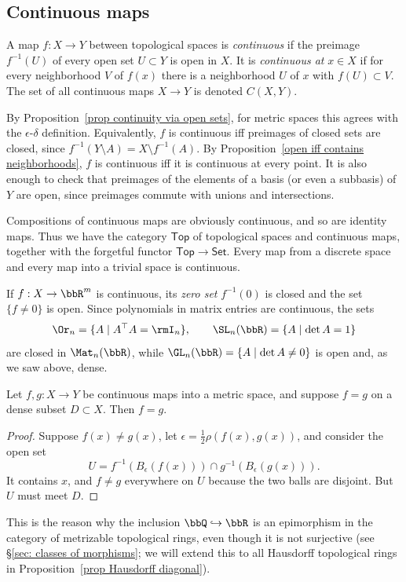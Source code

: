 \subsection{Continuous maps}

\begin{defn}
    A map $f:X\to Y$ between topological spaces is \emph{continuous} if the preimage $f^{-1}(U)$ of every open set $U\subset Y$ is open in $X$. It is \emph{continuous at} $x\in X$ if for every neighborhood $V$ of $f(x)$ there is a neighborhood $U$ of $x$ with $f(U)\subset V$. The set of all continuous maps $X\to Y$ is denoted $C(X,Y)$.
\end{defn}

By Proposition~\ref{prop continuity via open sets}, for metric spaces this agrees with the $\epsilon$-$\delta$ definition. Equivalently, $f$ is continuous iff preimages of closed sets are closed, since $f^{-1}(Y\setminus A)=X\setminus f^{-1}(A)$. By Proposition~\ref{open iff contains neighborhoods}, $f$ is continuous iff it is continuous at every point. It is also enough to check that preimages of the elements of a basis (or even a subbasis) of $Y$ are open, since preimages commute with unions and intersections.

Compositions of continuous maps are obviously continuous, and so are identity maps. Thus we have the category $\mathsf{Top}$ of topological spaces and continuous maps, together with the forgetful functor $\mathsf{Top}\to\mathsf{Set}$. Every map from a discrete space and every map into a trivial space is continuous.

\begin{example}\label{example zero sets}
    If $f:X\to\bbR^m$ is continuous, its \emph{zero set} $f^{-1}(0)$ is closed and the set $\{f\neq 0\}$ is open. Since polynomials in matrix entries are continuous, the sets
    \[\Or_n=\{A\mid A^\top A=\rmI_n\},\qquad \SL_n(\bbR)=\{A\mid\det A=1\}\]
    are closed in $\Mat_n(\bbR)$, while $\GL_n(\bbR)=\{A\mid\det A\neq0\}$ is open and, as we saw above, dense.
\end{example}

\begin{prop}\label{prop dense determines maps}
    Let $f,g:X\to Y$ be continuous maps into a metric space, and suppose $f=g$ on a dense subset $D\subset X$. Then $f=g$.
\end{prop}
\begin{proof}
    Suppose $f(x)\neq g(x)$, let $\epsilon=\frac12\rho(f(x),g(x))$, and consider the open set
    \[U=f^{-1}(B_\epsilon(f(x)))\cap g^{-1}(B_\epsilon(g(x))).\]
    It contains $x$, and $f\neq g$ everywhere on $U$ because the two balls are disjoint. But $U$ must meet $D$.
\end{proof}
This is the reason why the inclusion $\bbQ\hookrightarrow\bbR$ is an epimorphism in the category of metrizable topological rings, even though it is not surjective (see \S\ref{sec: classes of morphisms}; we will extend this to all Hausdorff topological rings in Proposition~\ref{prop Hausdorff diagonal}).

